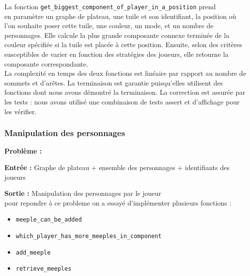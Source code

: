 \documentclass[10pt]{article}
\begin{document}
La fonction \texttt{get\_biggest\_component\_of\_player\_in\_a\_position} prend \\en paramètre un graphe de plateau, une tuile et son identifiant, la position où l'on souhaite poser cette tuile, une couleur, un mode, et un nombre de personnages. Elle calcule la plus grande composante connexe terminée de la couleur spécifiée si la tuile est placée à cette position. Ensuite, selon des critères susceptibles de varier en fonction des stratégies des joueurs, elle retourne la composante correspondante.\\

La complexité en temps des deux fonctions est linéaire par rapport au nombre de sommets et d'arêtes. La terminaison est garantie puisqu'elles utilisent des fonctions dont nous avons démontré la terminaison. La correction est assurée par les tests : nous avons utilisé une combinaison de tests assert et d'affichage pour les vérifier.













\subsubsection{Manipulation des personnages}


\textbf{Problème :}

\textbf{Entrée :} Graphe de plateau + ensemble des personnages + identifiants des joueurs

\textbf{Sortie :} Manipulation des personnages par le joueur\\
pour repondre à ce probleme on a essayé d'implémenter plusieurs fonctions :
\begin{itemize}
\item \texttt{meeple\_can\_be\_added}
\item \texttt{which\_player\_has\_more\_meeples\_in\_component}
\item \texttt{add\_meeple}
\item \texttt{retrieve\_meeples}
\end{itemize}
\end{document}
